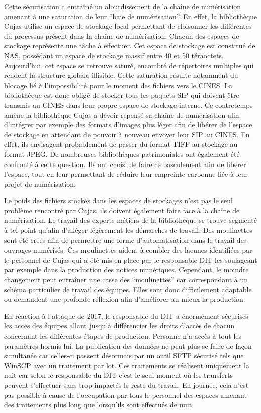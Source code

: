 Cette sécurisation a entraîné un alourdissement de la chaîne de numérisation amenant à une saturation de leur \enquote{baie de numérisation}. En effet, la bibliothèque Cujas utilise un espace de stockage local permettant de cloisonner les différentes du processus présent dans la chaîne de numérisation. Chacun des espaces de stockage représente une tâche à effectuer. Cet espace de stockage est constitué de NAS, possédant un espace de stockage massif entre 40 et 50 téraoctets. Aujourd'hui, cet espace se retrouve saturé, encombré de répertoires multiples qui rendent la structure globale illisible. Cette saturation résulte notamment du blocage lié à l'impossibilité pour le moment des fichiers vers le CINES. La bibliothèque est donc obligé de stocker tous les paquets SIP qui doivent être transmis au CINES dans leur propre espace de stockage interne. Ce contretemps amène la bibliothèque Cujas a devoir repensé sa chaîne de numérisation afin d'intégrer par exemple des formats d'images plus léger afin de libérer de l'espace de stockage en attendant de pouvoir à nouveau envoyer leur SIP au CINES. En effet, ils envisagent probablement de passer du format TIFF au stockage au format JPEG. De nombreuses bibliothèques patrimoniales ont également été confronté à cette question. Ils ont choisi de faire ce basculement afin de libérer l'espace, tout en leur permettant de réduire leur empreinte carbonne liée à leur projet de numérisation.

Le poids des fichiers stockés dans les espaces de stockages n'est pas le seul problème rencontré par Cujas, ils doivent également faire face à la chaîne de numérisation. Le travail des experts métiers de la bibliothèque se trouve segmenté à tel point qu'afin d'alléger légèrement les démarches de travail. Des moulinettes sont été crées afin de permettre une forme d'automatisation dans le travail des ouvrages numérisés. Ces moulinettes aident à combler des lacunes identifiées par le personnel de Cujas qui a été mis en place par le responsable DIT les soulageant par exemple dans la production des notices numériques. Cependant, le moindre changement peut entraîner une casse des \enquote{moulinettes} car correspondant à un schéma particulier de travail des équipes. Elles sont donc difficilement adaptable ou demandent une profonde réflexion afin d'améliorer au mieux la production. 

En réaction à l'attaque de 2017, le responsable du DIT a énormément sécurisés les accès des équipes allant jusqu'à différencier les droits d'accès de chacun concernant les différentes étapes de production. Personne n'a accès à tout les paramètres hormis lui. La publication des données ne peut plus se faire de façon simultanée car celles-ci passent désormais par un outil SFTP sécurisé tels que WinSCP avec un traitement par lot. Ces traitements se réalisent uniquement la nuit car selon le responsable du DIT c'est le seul moment où les transferts peuvent s'effectuer sans trop impactés le reste du travail. En journée, cela n'est pas possible à cause de l'occupation par tous le personnel des espaces amenant des traitements plus long que lorsqu'ils sont effectués de nuit.

